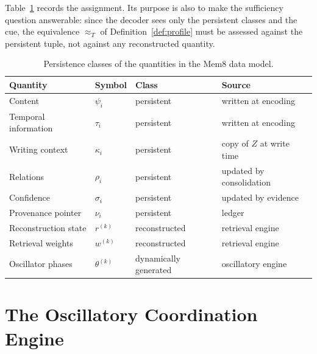 Table~\ref{tab:persist} records the assignment. Its purpose is also to make the sufficiency question answerable: since the decoder sees only the persistent classes and the cue, the equivalence $\approx_T$ of Definition~\ref{def:profile} must be assessed against the persistent tuple, not against any reconstructed quantity.

\begin{table}[t]
\centering
\small
\renewcommand{\arraystretch}{1.2}
\begin{tabular}{@{}llll@{}}
\toprule
Quantity & Symbol & Class & Source\\
\midrule
Content & $\psi_i$ & persistent & written at encoding\\
Temporal information & $\tau_i$ & persistent & written at encoding\\
Writing context & $\kappa_i$ & persistent & copy of $Z$ at write time\\
Relations & $\rho_i$ & persistent & updated by consolidation\\
Confidence & $\sigma_i$ & persistent & updated by evidence\\
Provenance pointer & $\nu_i$ & persistent & ledger\\
Reconstruction state & $r^{(k)}$ & reconstructed & retrieval engine\\
Retrieval weights & $w^{(k)}$ & reconstructed & retrieval engine\\
Oscillator phases & $\theta^{(k)}$ & dynamically generated & oscillatory engine\\
\bottomrule
\end{tabular}
\caption{Persistence classes of the quantities in the Mem8 data model.}\label{tab:persist}
\end{table}

\chapter{The Oscillatory Coordination Engine}\label{ch:oscengine}


